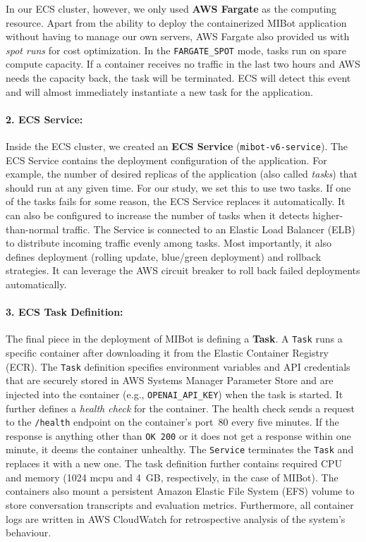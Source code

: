 In our ECS cluster, however, we only used \textbf{AWS Fargate} as the computing resource. Apart from the ability to deploy the containerized MIBot application without having to manage our own servers, AWS Fargate also provided us with \emph{spot runs} for cost optimization. In the \texttt{FARGATE\_SPOT} mode, tasks run on spare compute capacity. If a container receives no traffic in the last two hours and AWS needs the capacity back, the task will be terminated. ECS will detect this event and will almost immediately instantiate a new task for the application.

\paragraph{2. ECS Service:}Inside the ECS cluster, we created an \textbf{ECS Service} (\texttt{mibot-v6-service}). The ECS Service contains the deployment configuration of the application. For example, the number of desired replicas of the application (also called \emph{tasks}) that should run at any given time.  For our study, we set this to use two tasks. If one of the tasks fails for some reason, the ECS Service replaces it automatically. It can also be configured to increase the number of tasks when it detects higher-than-normal traffic. The Service is connected to an Elastic Load Balancer (ELB) to distribute incoming traffic evenly among tasks. Most importantly, it also defines deployment (rolling update, blue/green deployment) and rollback strategies. It can leverage the AWS circuit breaker to roll back failed deployments automatically.

\paragraph{3. ECS Task Definition:}The final piece in the deployment of MIBot is defining a \textbf{Task}. A \texttt{Task} runs a specific container after downloading it from the Elastic Container Registry (ECR). The \texttt{Task} definition specifies environment variables and API credentials that are securely stored in AWS Systems Manager Parameter Store and are injected into the container (e.g., \texttt{OPENAI\_API\_KEY}) when the task is started. It further defines a \emph{health check} for the container. The health check sends a request to the \texttt{/health} endpoint on the container's port~80 every five minutes. If the response is anything other than \texttt{OK 200} or it does not get a response within one minute, it deems the container unhealthy. The \texttt{Service} terminates the \texttt{Task} and replaces it with a new one. The task definition further contains required CPU and memory (1024 mcpu and 4~GB, respectively, in the case of MIBot). The containers also mount a persistent Amazon Elastic File System (EFS) volume to store conversation transcripts and evaluation metrics. Furthermore, all container logs are written in AWS CloudWatch for retrospective analysis of the system's behaviour.

